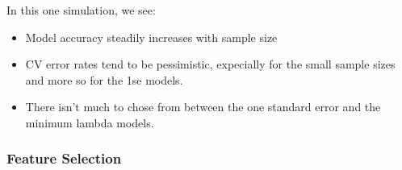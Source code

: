 \documentclass[
]{book}
\begin{document}
In this one simulation, we see:

\begin{itemize}
\item
  Model accuracy steadily increases with sample size
\item
  CV error rates tend to be pessimistic, expecially for the small sample sizes
  and more so for the 1se models.
\item
  There isn't much to chose from between the one standard error and the minimum lambda models.
\end{itemize}

\hypertarget{feature-selection-2}{%
\subsubsection{Feature Selection}\label{feature-selection-2}}
\end{document}
